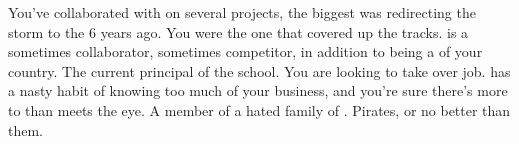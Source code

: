 \documentclass[char]{GL2020}
\begin{document}
\begin{itemz}[Notes]
	\item 
\end{itemz}

\begin{contacts}
	\contact{\cDiplomat{}} You’ve collaborated with \cDiplomat{} on several projects, the biggest was redirecting the storm to the \pShip{} 6 years ago. You were the one that covered up the tracks.
	\contact{\cPrince{}} is a sometimes collaborator, sometimes competitor, in addition to being a \cPrince{\Heir} of your country.
\contact{\cPrincipal{}} The current principal of the school. You are looking to take over \cPrincipal{\their} job.
\contact{\cInterpol{}} has a nasty habit of knowing too much of your business, and you’re sure there’s more to \cInterpol{\them} than meets the eye.
\contact{\cJuniorStatesman{}} A member of a hated family of \pShippies{}. Pirates, or no better than them.
\end{contacts}
\end{document}
